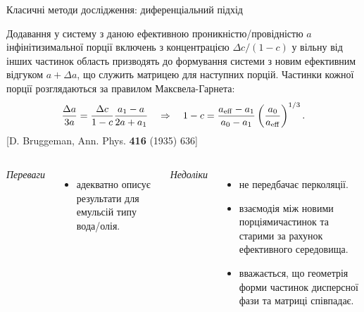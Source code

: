 \documentclass[10pt]{beamer}
\begin{document}
\begin{frame}{Класичні методи дослідження: диференціальний підхід}

\footnotesize
    Додавання у систему з даною ефективною проникністю/провідністю $a$ інфінітизимальної порції включень з концентрацією $\Delta c/(1-c)$ у вільну від інших частинок область призводять до формування системи з новим ефективним відгуком $a+\Delta a$, що служить матрицею для наступних порцій. Частинки кожної порції розглядаються за правилом Максвела-Гарнета:
    \begin{equation}\label{eq:AEMA}
        \frac{\Delta a}{3a} = \frac{\Delta c}{1-c} \frac{a_1 - a}{2a + a_1} \quad\Rightarrow\quad
        1 - c = \frac{a_{\rm eff} - a_1}{a_0 - a_1} \left( \frac{{ a_0}}{a_{\rm eff}} \right)^{1/3}.
    \end{equation}
    [D. Bruggeman, Ann. Phys. {\bf 416} (1935) 636]
    \vspace{-5pt}
    \begin{columns}[T,onlytextwidth]
          \begin{center}
          {\it Переваги}
          \end{center}
          \vspace{-10pt}
          \begin{itemize}
              \item адекватно описує результати для емульсій типу вода/олія.
          \end{itemize}
    
          \begin{center}
          {\it Недоліки}
          \end{center}
          \vspace{-10pt}
          \begin{itemize}
              \item не передбачає перколяції.
              \item взаємодія між новими порціямичастинок та старими за рахунок ефективного середовища.
              \item вважається, що геометрія форми частинок дисперсної фази та матриці співпадає.
          \end{itemize}
    \end{columns}
  
\end{frame}
\end{document}

